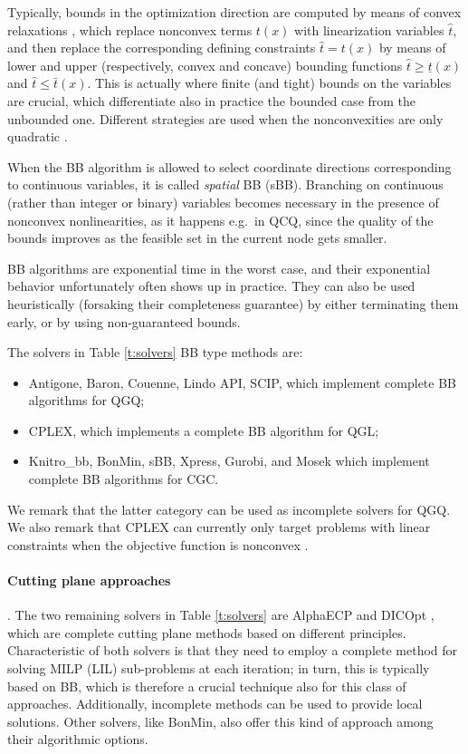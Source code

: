 Typically, bounds in the optimization direction are computed by means of convex relaxations \cite{mccormick,couenne}, which replace nonconvex terms $t(x)$ with linearization variables $\hat{t}$, and then replace the corresponding defining constraints $\hat{t} = t(x)$ by means of lower and upper (respectively, convex and concave) bounding functions $\hat{t} \ge \underline{t}(x)$ and $\hat{t} \le\bar{t}(x)$. This is actually where finite (and tight) bounds on the variables are crucial, which differentiate also in practice the bounded case from the unbounded one. Different strategies are used when the nonconvexities are only quadratic \cite{glomiqo,bliek}.

When the BB algorithm is allowed to select coordinate directions corresponding to continuous variables, it is called {\it spatial} BB (sBB). Branching on continuous (rather than integer or binary) variables becomes necessary in the presence of nonconvex nonlinearities, as it happens e.g.~in QCQ, since the quality of the bounds improves as the feasible set in the current node gets smaller.

BB algorithms are exponential time in the worst case, and their exponential behavior unfortunately often shows up in practice. They can also be used heuristically (forsaking their completeness guarantee) by either terminating them early, or by using non-guaranteed bounds.

The solvers in Table \ref{t:solvers} BB type methods are:
%
\begin{itemize}
 \item {\sc Antigone}, {\sc Baron}, {\sc Couenne}, {\sc Lindo API}, {\sc SCIP}, which implement complete BB algorithms for QGQ;
\item {\sc CPLEX}, which implements a complete BB algorithm for QGL;
%
 \item {\sc Knitro\_bb}, {\sc BonMin}, {\sc sBB}, {\sc Xpress}, {\sc Gurobi}, and {\sc Mosek} which implement complete BB algorithms for CGC.
\end{itemize}
%
We remark that the latter category can be used as incomplete solvers for QGQ. We also remark that CPLEX can currently only target problems with linear constraints when the objective function is nonconvex \cite{bliek}.


\paragraph{Cutting plane approaches}.
%
The two remaining solvers in Table \ref{t:solvers} are {\sc AlphaECP} \cite{westerlund} and {\sc DICOpt} \cite{quesada}, which are complete cutting plane methods based on different principles. Characteristic of both solvers is that they need to employ a complete method for solving MILP (LIL) sub-problems at each iteration; in turn, this is typically based on BB, which is therefore a crucial technique also for this class of approaches. Additionally, incomplete methods can be used to provide local solutions. Other solvers, like {\sc BonMin}, also offer this kind of approach among their algorithmic options.

